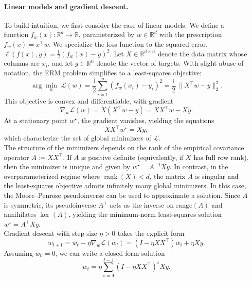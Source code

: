 \paragraph{Linear models and gradient descent.}
To build intuition, we first consider the case of linear models.
We define a function $f_w(x): \mathbb{R}^d \to \mathbb{R}$, parameterized by $w \in \mathbb{R}^d$
with the prescription $f_w(x) = x^\top w$. We specialize the loss function to the squared
error, $\ell(f(x), y) =  \frac{1}{2}(f_w(x) - y)^2$.
Let $X\in\mathbb{R}^{d\times n}$ denote the data
matrix whose columns are $x_i$, and let $y\in\mathbb{R}^n$ denote the vector
of targets. With slight abuse of notation, the ERM problem simplifies to a least-squares objective:
\begin{equation}
	\arg\min_w \; \mathcal{L}(w)= \frac{1}{2} \sum_{i=1}^{n}(f_w(x_i) - y_i)^2 = \frac{1}{2}\,\|X^\top w-y\|_2^2.
\end{equation}
This objective is convex and differentiable, with gradient
\begin{equation}
	\nabla_w \mathcal{L}(w)=X(X^\top w-y)=XX^\top w - Xy.
\end{equation}
At a stationary point $w^\star$, the gradient vanishes, yielding the equations
\begin{equation}
	XX^\top w^\star = Xy,
\end{equation}
which characterize the set of global minimizers of $\mathcal{L}$.\\
The structure of the minimizers depends on the rank of the empirical covariance
operator $A := XX^\top$. If $A$ is positive definite (equivalently, if $X$ has
full row rank), then the minimizer is unique and given by $w^\star = A^{-1}Xy$.
In contrast, in the overparameterized regime where $\operatorname{rank}(X)<d$,
the matrix $A$ is singular and the least-squares objective admits infinitely
many global minimizers. In this case, the Moore--Penrose pseudoinverse can be
used to approximate a solution. Since $A$ is symmetric, its pseudoinverse
$A^{+}$ acts as the inverse on $\mathrm{range}(A)$ and annihilates $\ker(A)$,
yielding the minimum-norm least-squares solution $w^\star = A^{+}Xy$.\\
Gradient descent with step size $\eta>0$ takes the explicit form
\begin{equation}
	w_{t+1}=w_t-\eta \nabla_w \mathcal{L}(w_t)
	=\left(I-\eta XX^\top\right)w_t+\eta Xy.
\end{equation}
Assuming $w_0=0$, we can write a closed form solution
\begin{equation}
	w_t
	=\eta \sum_{s=0}^{t-1}\left(I-\eta XX^\top\right)^s Xy.
\end{equation}
